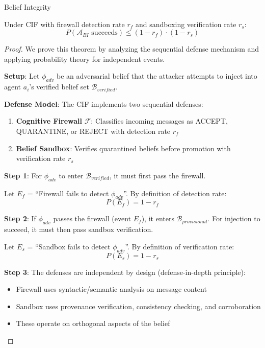 \documentclass[
  ignorenonframetext,
]{beamer}
\begin{document}
\begin{frame}[allowframebreaks]{Belief Integrity}
\protect{}\label{sec:belief-integrity-proof}
\begin{theorem}
\label{thm:belief-injection}
Under CIF with firewall detection rate $r_f$ and sandboxing verification rate $r_s$:
\begin{equation}
\label{eq:belief-injection-bound}
P(\mathcal{A}_{BI} \text{ succeeds}) \leq (1 - r_f) \cdot (1 - r_s)
\end{equation}
\end{theorem}

\begin{proof}
We prove this theorem by analyzing the sequential defense mechanism and applying probability theory for independent events.

\textbf{Setup}: Let $\phi_{adv}$ be an adversarial belief that the attacker attempts to inject into agent $a_i$'s verified belief set $\mathcal{B}_{verified}$.

\textbf{Defense Model}: The CIF implements two sequential defenses:
\begin{enumerate}
\item \textbf{Cognitive Firewall} $\mathcal{F}$: Classifies incoming messages as ACCEPT, QUARANTINE, or REJECT with detection rate $r_f$
\item \textbf{Belief Sandbox}: Verifies quarantined beliefs before promotion with verification rate $r_s$
\end{enumerate}

\textbf{Step 1}: For $\phi_{adv}$ to enter $\mathcal{B}_{verified}$, it must first pass the firewall.

Let $E_f$ = ``Firewall fails to detect $\phi_{adv}$''. By definition of detection rate:
\begin{equation}
\label{eq:firewall-evasion}
P(E_f) = 1 - r_f
\end{equation}

\textbf{Step 2}: If $\phi_{adv}$ passes the firewall (event $E_f$), it enters $\mathcal{B}_{provisional}$. For injection to succeed, it must then pass sandbox verification.

Let $E_s$ = ``Sandbox fails to detect $\phi_{adv}$''. By definition of verification rate:
\begin{equation}
\label{eq:sandbox-evasion}
P(E_s) = 1 - r_s
\end{equation}

\textbf{Step 3}: The defenses are independent by design (defense-in-depth principle):
\begin{itemize}
\item Firewall uses syntactic/semantic analysis on message content
\item Sandbox uses provenance verification, consistency checking, and corroboration
\item These operate on orthogonal aspects of the belief
\end{itemize}


\end{proof}
\end{frame}
\end{document}
